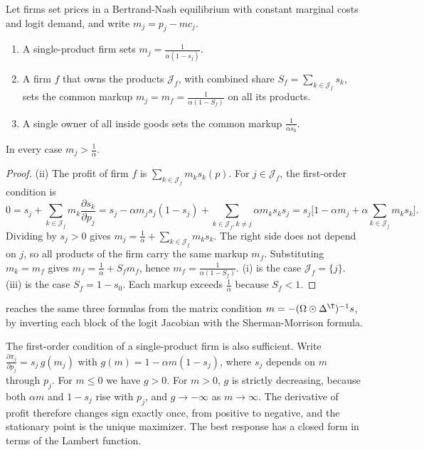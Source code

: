 \begin{proposition}\label{prop:B-logit-markups}
Let firms set prices in a Bertrand-Nash equilibrium with constant marginal costs and logit demand, and write
$m_j = p_j - mc_j$.
\begin{enumerate}[label=(\roman*)]
\item A single-product firm sets $m_j = \frac{1}{\alpha(1 - s_j)}$.
\item A firm $f$ that owns the products $\mathcal{J}_f$, with combined share $S_f = \sum_{k \in \mathcal{J}_f}s_k$, sets
  the common markup $m_j = m_f = \frac{1}{\alpha(1 - S_f)}$ on all its products.
\item A single owner of all inside goods sets the common markup $\frac{1}{\alpha s_0}$.
\end{enumerate}
In every case $m_j > \frac{1}{\alpha}$.
\end{proposition}

\begin{proof}
(ii) The profit of firm $f$ is $\sum_{k \in \mathcal{J}_f}m_ks_k(p)$. For $j \in \mathcal{J}_f$, the first-order condition is
\begin{equation*}
0 = s_j + \sum_{k \in \mathcal{J}_f}m_k\frac{\partial s_k}{\partial p_j}
= s_j - \alpha m_js_j(1 - s_j) + \sum_{k \in \mathcal{J}_f, k \neq j}\alpha m_ks_ks_j
= s_j\Big[1 - \alpha m_j + \alpha\sum_{k \in \mathcal{J}_f}m_ks_k\Big].
\end{equation*}
Dividing by $s_j > 0$ gives $m_j = \frac{1}{\alpha} + \sum_{k \in \mathcal{J}_f}m_ks_k$. The right side does not depend
on $j$, so all products of the firm carry the same markup $m_f$. Substituting $m_k = m_f$ gives
$m_f = \frac{1}{\alpha} + S_fm_f$, hence $m_f = \frac{1}{\alpha(1 - S_f)}$. (i) is the case $\mathcal{J}_f = \{j\}$. (iii) is the
case $S_f = 1 - s_0$. Each markup exceeds $\frac{1}{\alpha}$ because $S_f < 1$.
\end{proof}

 reaches the same three formulas from the matrix condition
$m = -(\Omega \odot \Delta^\T)^{-1}s$, by inverting each block of the logit Jacobian with the Sherman-Morrison formula.

The first-order condition of a single-product firm is also sufficient. Write
$\frac{\partial\pi_j}{\partial p_j} = s_j\,g(m_j)$ with $g(m) = 1 - \alpha m(1 - s_j)$, where $s_j$ depends on $m$ through
$p_j$. For $m \leq 0$ we have $g > 0$. For $m > 0$, $g$ is strictly decreasing, because both $\alpha m$ and
$1 - s_j$ rise with $p_j$, and $g \to -\infty$ as $m \to \infty$. The derivative of profit therefore changes sign
exactly once, from positive to negative, and the stationary point is the unique maximizer. The best
response has a closed form in terms of the Lambert function.

